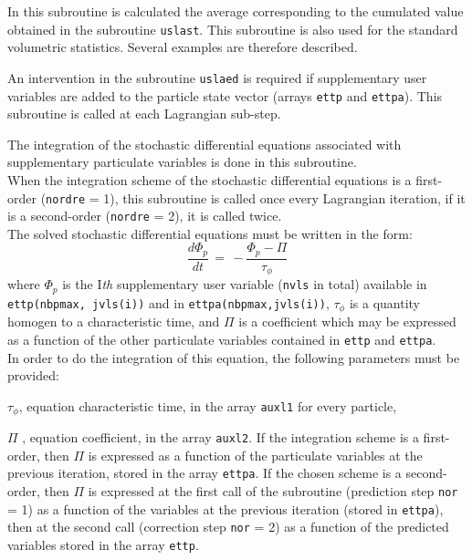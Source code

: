 {{{\noindent
In this subroutine is calculated the average corresponding to the
cumulated value obtained in the subroutine \texttt{uslast}. This subroutine is
also used for the standard volumetric statistics. Several examples are
therefore described.




\noindent
An intervention in the subroutine \texttt{uslaed} is required if supplementary user
variables are added to the particle state vector (arrays \texttt{ettp}
and \texttt{ettpa}). This subroutine is called at each Lagrangian sub-step.

\noindent
The integration of the stochastic differential equations associated with
supplementary particulate variables is done in this subroutine. \\
When the integration scheme of the stochastic differential equations is
a first-order (\texttt{nordre} = 1), this subroutine is called once every
Lagrangian iteration, if it is a second-order (\texttt{nordre} = 2), it is called
twice. \\

\noindent
The solved stochastic differential equations must be written in the
form:
\begin{displaymath}
\frac{d \Phi_p}{dt} \,=\, - \frac{\Phi_p - \Pi}{\tau_\phi}
\end{displaymath}
where $\Phi_p$ is the I\textit{th} supplementary user variable (\texttt{nvls} in
total) available in \texttt{ettp(nbpmax, jvls(i))} and in
 \texttt{ettpa(nbpmax,jvls(i))},
$\tau_\phi$ is a quantity homogen to a characteristic time, and $\Pi$ is
a coefficient which may be expressed as a function of the other
particulate variables contained in \texttt{ettp} and \texttt{ettpa}. \\
In order to do the integration of this equation, the following
parameters must be provided:
\begin{list}{-}{}
\item $\tau_\phi$, equation characteristic time, in the array \texttt{auxl1} for
      every particle,
\item $\Pi$ , equation coefficient, in the array \texttt{auxl2}. If the
      integration scheme is a first-order, then $\Pi$ is expressed as a
      function of the particulate variables at the previous iteration,
      stored in the array \texttt{ettpa}. If the chosen scheme is a second-order,
      then $\Pi$ is expressed at the first call of the subroutine
      (prediction step \texttt{nor} = 1) as a function of the variables at the
      previous iteration (stored in \texttt{ettpa}), then at the second call
      (correction step \texttt{nor} = 2) as a function of the predicted variables
      stored in the array \texttt{ettp}.
\end{list}

}}}
